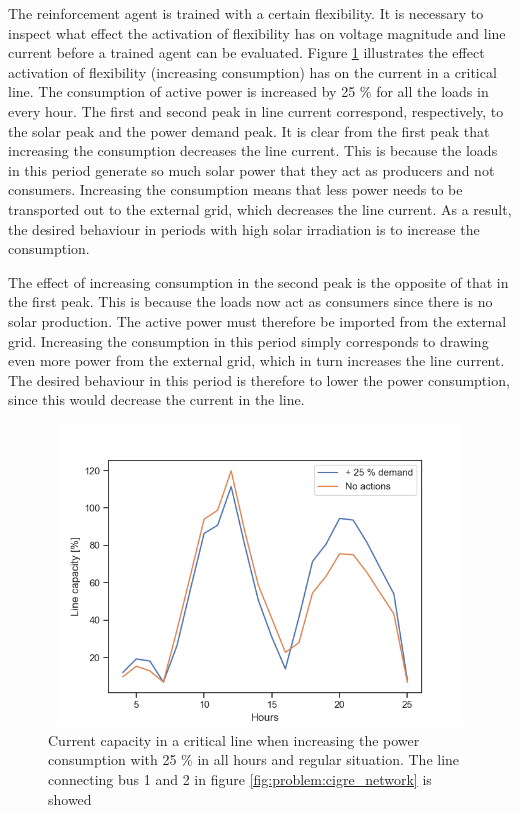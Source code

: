 \documentclass[class=book, crop=false]{standalone}
\begin{document}
The reinforcement agent is trained with a certain flexibility. It is necessary to inspect what effect the activation of flexibility has on voltage magnitude and line current before a trained agent can be evaluated. Figure \ref{fig:results:increase_demand_current} illustrates the effect activation of flexibility (increasing consumption) has on the current in a critical line. The consumption of active power is increased by 25 \% for all the loads in every hour. The first and second peak in line current correspond, respectively, to the solar peak and the power demand peak. It is clear from the first peak that increasing the consumption decreases the line current. This is because the loads in this period generate so much solar power that they act as producers and not consumers. Increasing the consumption means that less power needs to be transported out to the external grid, which decreases the line current. As a result, the desired behaviour in periods with high solar irradiation is to increase the consumption.

The effect of increasing consumption in the second peak is the opposite of that in the first peak. This is because the loads now act as consumers since there is no solar production. The active power must therefore be imported from the external grid. Increasing the consumption in this period simply corresponds to drawing even more power from the external grid, which in turn increases the line current. The desired behaviour in this period is therefore to lower the power consumption, since this would decrease the current in the line. 

\begin{figure}[ht]
    \center
\includegraphics[height=8cm, width=12cm]{figures/increase_demand_current.png}
    \caption[size = 9]{Current capacity in a critical line when increasing the power consumption with 25 \% in all hours and regular situation. The line connecting bus 1 and 2 in figure \ref{fig:problem:cigre_network} is showed}
    \label{fig:results:increase_demand_current}
\end{figure}
\end{document}
